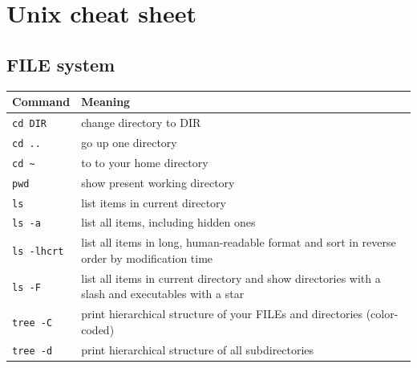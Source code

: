 \documentclass[11pt]{article}
\begin{document}
\section{Unix cheat sheet}
\label{sec-7}
\subsection{FILE system}
\label{sec-7-1}

\small


\begin{center}
\begin{tabular}{ll}
 Command                        &  Meaning                                                                                                \\
\hline
 \texttt{cd DIR}                &  change directory to DIR                                                                                \\
\hline
 \texttt{cd ..}                 &  go up one directory                                                                                    \\
\hline
 \texttt{cd \textasciitilde{}}  &  to to your home directory                                                                              \\
\hline
 \texttt{pwd}                   &  show present working directory                                                                         \\
\hline
 \texttt{ls}                    &  list items in current directory                                                                        \\
\hline
 \texttt{ls -a}                 &  list all items, including hidden ones                                                                  \\
\hline
 \texttt{ls -lhcrt}             &  list all items in long, human-readable format and sort in reverse order by modification time           \\
\hline
 \texttt{ls -F}                 &  list all items in current directory and show directories with a slash and executables with a star      \\
\hline
 \texttt{tree  -C}              &  print hierarchical structure of your FILEs and directories (color-coded)                               \\
\hline
 \texttt{tree -d}               &  print hierarchical structure of all subdirectories                                                     \\

\end{tabular}
\end{center}
\end{document}
